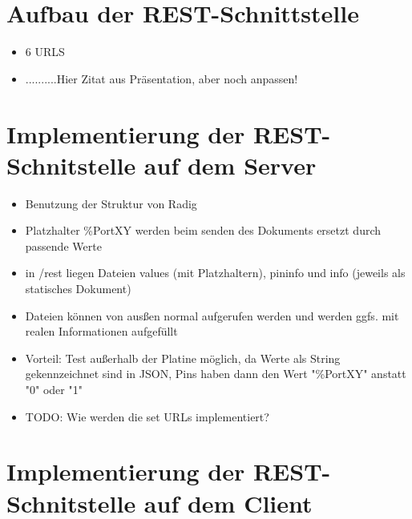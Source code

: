 \section*{Aufbau der REST-Schnittstelle}

\begin{itemize}
	\item 6 URLS
	\item ..........Hier Zitat aus Präsentation, aber noch anpassen!
\end{itemize}
	
\section*{Implementierung der REST-Schnitstelle auf dem Server}

\begin{itemize}
	\item Benutzung der Struktur von Radig
	\item Platzhalter \%PortXY werden beim senden des Dokuments ersetzt durch passende 
		  Werte
	\item in /rest liegen Dateien values (mit Platzhaltern), pininfo und info (jeweils als
	      statisches Dokument)
	\item Dateien können von ausßen normal aufgerufen werden und werden ggfs. mit realen 
	      Informationen aufgefüllt
	\item Vorteil: Test außerhalb der Platine möglich, da Werte als String gekennzeichnet 
	      sind in JSON, Pins haben dann den Wert "\%PortXY" anstatt "0" oder "1"
	\item TODO: Wie werden die set URLs implementiert?
\end{itemize}

\section*{Implementierung der REST-Schnitstelle auf dem Client}

